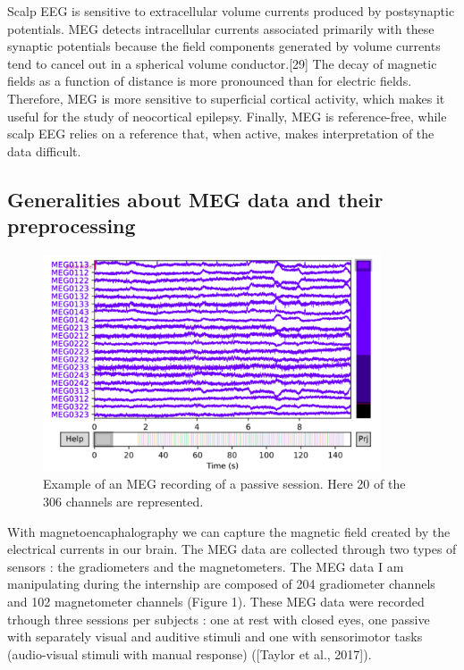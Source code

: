 Scalp EEG is sensitive to extracellular volume currents produced by postsynaptic potentials. MEG detects intracellular currents associated primarily with these synaptic potentials because the field components generated by volume currents tend to cancel out in a spherical volume conductor.[29] The decay of magnetic fields as a function of distance is more pronounced than for electric fields. Therefore, MEG is more sensitive to superficial cortical activity, which makes it useful for the study of neocortical epilepsy. Finally, MEG is reference-free, while scalp EEG relies on a reference that, when active, makes interpretation of the data difficult.


\subsection{Generalities about MEG data and their preprocessing}

\begin{figure}[ht]
    \centering
    \includegraphics[width=10cm]{images_report/preprocessing/raw_data/Example_of_MEG_recording_reduced.png}
    \caption{Example of an MEG recording of a passive session. Here 20 of the 306 channels are represented.}
\end{figure}

With magnetoencaphalography we can capture the magnetic field created by the electrical currents in our brain. The MEG data are collected through two types of sensors : the gradiometers and the magnetometers. The MEG data I am manipulating during the internship are composed of 204 gradiometer channels and 102 magnetometer channels (Figure 1). These MEG data were recorded
trhough three sessions per subjects : one at rest with closed eyes, one passive with separately visual
and auditive stimuli and one with sensorimotor tasks (audio-visual stimuli with manual response)
([Taylor et al., 2017]).






